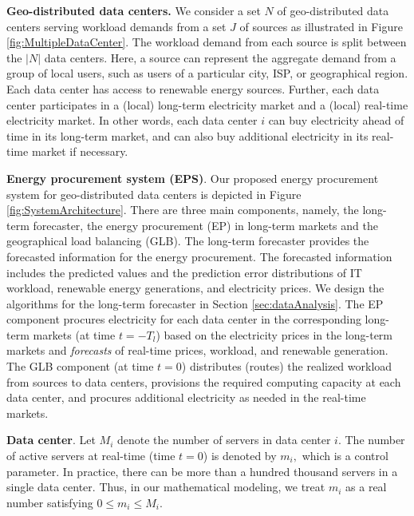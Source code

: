 \textbf{Geo-distributed data centers.} We consider a set $N$ of geo-distributed data centers serving workload demands from a set $J$ of sources as illustrated in Figure \ref{fig:MultipleDataCenter}. The workload demand from each source is split between the $|N|$ data centers. Here, a source can represent the aggregate demand from a group of local users, such as users of a particular city, ISP, or geographical region. Each data center has access to renewable energy sources. Further, each data center participates in a (local) long-term electricity market and a (local) real-time electricity market. In other words, each data center $i$ can buy electricity ahead of time in its long-term market, and can also buy additional electricity in its real-time market if necessary. %

\textbf{Energy procurement system (EPS)}. Our proposed energy
procurement system for geo-distributed data centers is depicted in
Figure \ref{fig:SystemArchitecture}. There are three main components,
namely, the long-term forecaster, the energy procurement
(EP) in long-term markets and the geographical load balancing (GLB). The long-term forecaster provides the forecasted
information for the energy procurement. The forecasted information
includes the predicted values and the prediction error distributions
of IT workload, renewable energy generations, and electricity
prices. We design the algorithms for the long-term forecaster in
Section \ref{sec:dataAnalysis}. The EP component procures electricity
for each data center in the corresponding long-term markets (at time
$t = -T_l$) based on the electricity prices in the long-term markets
and \emph{forecasts} of real-time prices, workload, and renewable
generation. The GLB component (at time $t = 0$) distributes (routes)
the realized workload from sources to data centers, provisions the
required computing capacity at each data center, and procures
additional electricity as needed in the real-time markets.

\textbf{Data center}. Let $M_i$ denote the number of servers in data
center $i$. The number of active servers at real-time (time $t=0$) is
denoted by $m_i,$ which is a control parameter. In practice, there can
be more than a hundred thousand servers in a single data center. Thus,
in our mathematical modeling, we treat $m_i$ as a real number
satisfying $0 \leq m_i \leq M_i.$

